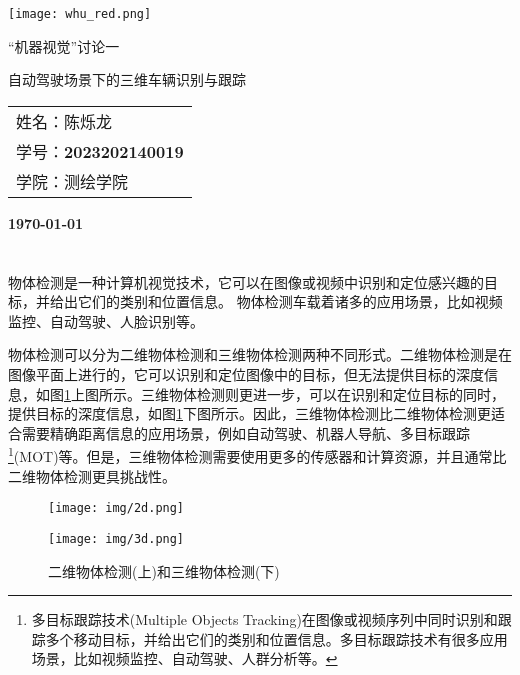 \documentclass[12pt, twocolumn]{article}
\title{\normf{编程：观测值逐次更新的扩展卡尔曼滤波器}}
\author{\normf 姓名：陈烁龙\;\;\;学号：2023202140019\;\;\;学院：测绘学院}
\date{\normf{\today}}
\newcommand\normf{\fangsong}
\begin{document}
	\begin{titlepage}
	    \centering
	    \texttt{[image: whu\_red.png]}\par\vspace{1cm}
	    \vspace{4cm}
	    {\huge\kaishu “机器视觉”讨论一\par 自动驾驶场景下的三维车辆识别与跟踪 \par}
	    \vspace{3cm}
	    {\Large\kaishu 
	    \begin{center}\begin{tabular}{l}
	    姓名：陈烁龙\\
	    学号：\bfseries 2023202140019\\
	    学院：测绘学院
	    \end{tabular}\end{center}
	     \par}
	    
	
	    \vfill
	
	    {\large\kaishu\bfseries \today\par}
	\end{titlepage}
 		\thispagestyle{empty}
		\clearpage
		
		\tableofcontents
		\newpage
		\listoffigures
		
		\clearpage
		\setcounter{page}{1}
	
	\section{\normf{研究背景与现状}}
	\normf
	物体检测是一种计算机视觉技术，它可以在图像或视频中识别和定位感兴趣的目标，并给出它们的类别和位置信息。
	物体检测车载着诸多的应用场景，比如视频监控、自动驾驶、人脸识别等。
	
	物体检测可以分为二维物体检测和三维物体检测两种不同形式。二维物体检测是在图像平面上进行的，它可以识别和定位图像中的目标，但无法提供目标的深度信息，如图\ref{fig:物体检测}上图所示。三维物体检测则更进一步，可以在识别和定位目标的同时，提供目标的深度信息，如图\ref{fig:物体检测}下图所示。因此，三维物体检测比二维物体检测更适合需要精确距离信息的应用场景，例如自动驾驶、机器人导航、多目标跟踪\footnote{\normf 多目标跟踪技术(Multiple Objects Tracking)在图像或视频序列中同时识别和跟踪多个移动目标，并给出它们的类别和位置信息。多目标跟踪技术有很多应用场景，比如视频监控、自动驾驶、人群分析等。}(MOT)等。但是，三维物体检测需要使用更多的传感器和计算资源，并且通常比二维物体检测更具挑战性。
	\begin{figure}[h]
		\centering
		\texttt{[image: img/2d.png]}
		
		\vspace{2 mm}
		
		\texttt{[image: img/3d.png]}
		\caption{\normf 二维物体检测(上)和三维物体检测(下)}
		\label{fig:物体检测}
	\end{figure}
	
\end{document}
